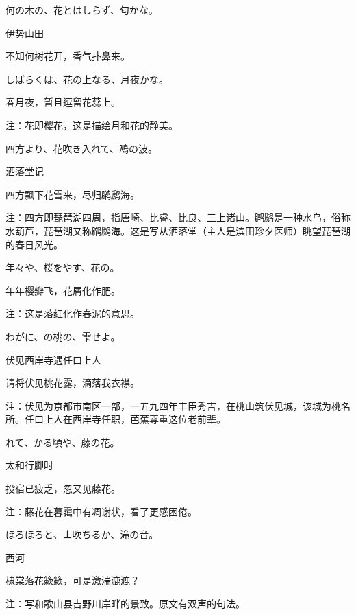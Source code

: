 \begin{haiku}
    {\FH 何の木の、花とはしらず、匂かな。}

    {\FK 伊势山田}

    {\FK 不知何树花开，香气扑鼻来。}
\end{haiku}

\begin{haiku}
    {\FH しばらくは、花の上なる、月夜かな。}

    {\FK 春月夜，暂且逗留花蕊上。}

    {\FT 注：花即樱花，这是描绘月和花的静美。}
\end{haiku}

\begin{haiku}
    {\FH 四方より、花吹き入れて、鳰の波。}

    {\FK 洒落堂记}

    {\FK 四方飘下花雪来，尽归䴙䴘海。}

    {\FT 注：四方即琵琶湖四周，指唐崎、比睿、比良、三上诸山。䴙䴘是一种水鸟，俗称水葫芦，琵琶湖又称䴙䴘海。这是写从洒落堂（主人是滨田珍夕医师）眺望琵琶湖的春日风光。}
\end{haiku}

\begin{haiku}
    {\FH 年々や、桜をやす、花の。}

    {\FK 年年樱瓣飞，花屑化作肥。}

    {\FT 注：这是落红化作春泥的意思。}
\end{haiku}

\begin{haiku}
    {\FH わがに、の桃の、雫せよ。}

    {\FK 伏见西岸寺遇任口上人}

    {\FK 请将伏见桃花露，滴落我衣襟。}

    {\FT 注：伏见为京都市南区一部，一五九四年丰臣秀吉，在桃山筑伏见城，该城为桃名所。任口上人在西岸寺任职，芭蕉尊重这位老前辈。}
\end{haiku}

\begin{haiku}
    {\FH {}れて、かる頃や、藤の花。}

    {\FK 太和行脚时}

    {\FK 投宿已疲乏，忽又见藤花。}

    {\FT 注：藤花在暮霭中有凋谢状，看了更感困倦。}
\end{haiku}

\begin{haiku}
    {\FH ほろほろと、山吹ちるか、滝の音。}

    {\FK 西河}

    {\FK 棣棠落花簌簌，可是激湍漉漉？}

    {\FT 注：写和歌山县吉野川岸畔的景致。原文有双声的句法。}
\end{haiku}

